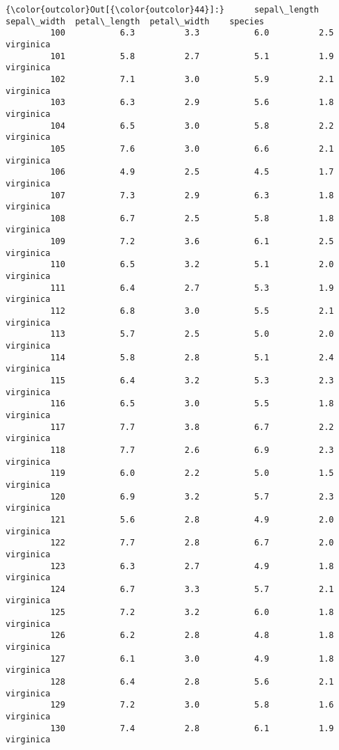 \documentclass[11pt]{article}
\begin{document}
\begin{Verbatim}[commandchars=\\\{\}]
{\color{outcolor}Out[{\color{outcolor}44}]:}      sepal\_length  sepal\_width  petal\_length  petal\_width    species
         100           6.3          3.3           6.0          2.5  virginica
         101           5.8          2.7           5.1          1.9  virginica
         102           7.1          3.0           5.9          2.1  virginica
         103           6.3          2.9           5.6          1.8  virginica
         104           6.5          3.0           5.8          2.2  virginica
         105           7.6          3.0           6.6          2.1  virginica
         106           4.9          2.5           4.5          1.7  virginica
         107           7.3          2.9           6.3          1.8  virginica
         108           6.7          2.5           5.8          1.8  virginica
         109           7.2          3.6           6.1          2.5  virginica
         110           6.5          3.2           5.1          2.0  virginica
         111           6.4          2.7           5.3          1.9  virginica
         112           6.8          3.0           5.5          2.1  virginica
         113           5.7          2.5           5.0          2.0  virginica
         114           5.8          2.8           5.1          2.4  virginica
         115           6.4          3.2           5.3          2.3  virginica
         116           6.5          3.0           5.5          1.8  virginica
         117           7.7          3.8           6.7          2.2  virginica
         118           7.7          2.6           6.9          2.3  virginica
         119           6.0          2.2           5.0          1.5  virginica
         120           6.9          3.2           5.7          2.3  virginica
         121           5.6          2.8           4.9          2.0  virginica
         122           7.7          2.8           6.7          2.0  virginica
         123           6.3          2.7           4.9          1.8  virginica
         124           6.7          3.3           5.7          2.1  virginica
         125           7.2          3.2           6.0          1.8  virginica
         126           6.2          2.8           4.8          1.8  virginica
         127           6.1          3.0           4.9          1.8  virginica
         128           6.4          2.8           5.6          2.1  virginica
         129           7.2          3.0           5.8          1.6  virginica
         130           7.4          2.8           6.1          1.9  virginica

\end{Verbatim}
\end{document}
